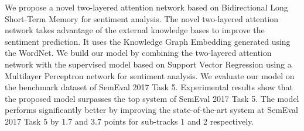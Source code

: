 We propose a novel two-layered attention network based on Bidirectional Long Short-Term Memory for sentiment analysis. The novel two-layered attention network takes advantage of the external knowledge bases to improve the sentiment prediction. It uses the Knowledge Graph Embedding generated using the WordNet. We build our model by combining the two-layered attention network with the supervised model based on Support Vector Regression using a Multilayer Perceptron network for sentiment analysis. We evaluate our model on the benchmark dataset of SemEval 2017 Task 5. Experimental results show that the proposed model surpasses the top system of SemEval 2017 Task 5. The model performs significantly better by improving the state-of-the-art system at SemEval 2017 Task 5 by 1.7 and 3.7 points for sub-tracks 1 and 2 respectively.
